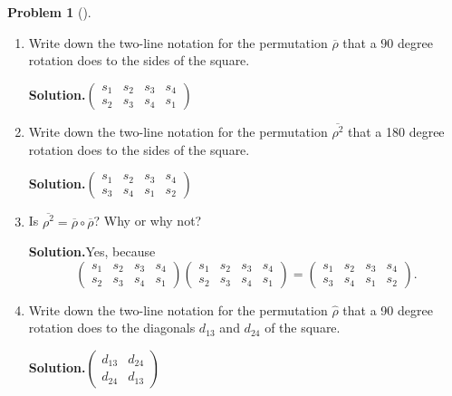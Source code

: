 \documentclass[10pt,]{book}
\theoremstyle{plain}
\theoremstyle{definition}
\newtheorem{activity}[project]{Problem}
\theoremstyle{definition}
\numberwithin{equation}{chapter}
\begin{document}
\begin{activity}[]\label{activity-279}
\leavevmode%
\begin{enumerate}[font=\bfseries,label=(\alph*),ref=\alph*]
\item\label{task-195} Write down the two-line notation for the permutation \(\overline{\rho}\) that a \(90\) degree rotation does to the sides of the square.%
\par\medskip\noindent%
\textbf{Solution.}\quad \(\displaystyle \begin{pmatrix} s_1& s_2& s_3& s_4\\s_2& s_3& s_4& s_1\end{pmatrix}\)%
\item\label{task-196} Write down the two-line notation for the permutation \(\overline{\rho^2}\) that  a 180 degree rotation does to the sides of the square.%
\par\medskip\noindent%
\textbf{Solution.}\quad \(\displaystyle \begin{pmatrix} s_1& s_2& s_3& s_4\\s_3& s_4& s_1& s_2\end{pmatrix}\)%
\item\label{task-197} Is \(\overline{\rho^2} = \overline\rho\circ\overline\rho\)? Why or why not?%
\par\medskip\noindent%
\textbf{Solution.}\quad Yes, because%
\begin{equation*}
\displaystyle \begin{pmatrix} s_1& s_2& s_3& s_4\\s_2& s_3& s_4& s_1\end{pmatrix} \begin{pmatrix} s_1& s_2& s_3& s_4\\s_2& s_3& s_4& s_1\end{pmatrix} = \begin{pmatrix} s_1& s_2& s_3& s_4\\s_3& s_4& s_1& s_2\end{pmatrix}\text{.}
\end{equation*}
%
\item\label{task-198} Write down the two-line notation for the permutation \(\widehat{\rho}\) that a 90 degree rotation does to the diagonals \(d_{13}\) and \(d_{24}\) of the square.%
\par\medskip\noindent%
\textbf{Solution.}\quad \(\displaystyle\begin{pmatrix} d_{13}& d_{24}\\ d_{24}& d_{13}\end{pmatrix}\)%

\end{enumerate}
\end{activity}
\end{document}
